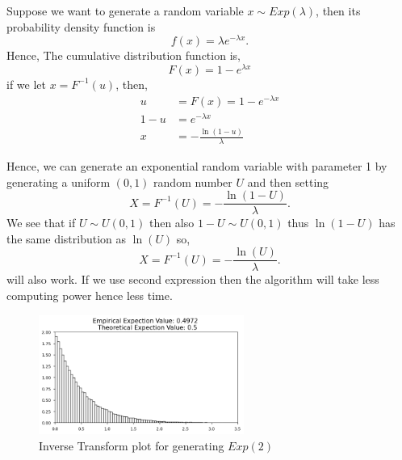\begin{example}
    \label{exponential distribution}
    Suppose we want to generate a random variable $x\sim Exp(\lambda)$, then its probability density function is 
    \[
    f(x) = \lambda e^{-\lambda x}.
    \] 
    Hence, The cumulative distribution function is,
    \[
    F(x) = 1-e^{\lambda x}
    \] 
    if we let $x=F^{-1}(u)$, then,
    \begin{align*}
        u&=F(x)=1-e^{-\lambda x} \\ 
         1-u &= e ^{-\lambda x}\\ 
         x &= - \frac{\ln(1-u)}{\lambda}
    \end{align*}
    
    Hence, we can generate an exponential random variable with parameter 1 by generating a uniform $(0,1)$ random number $U$ and then setting
    \[
    X = F^{-1}(U) = -\frac{\ln(1-U)}{\lambda}.
    \] 
    We see that if $U\sim U(0,1)$ then also $1-U\sim U(0,1)$ thus  $\ln(1-U)$ has the same distribution as  $\ln(U)$ so,
    \[
    X = F^{-1}(U) = -\frac{\ln(U)}{\lambda}.
    \] 
    will also work. If we use second expression then the algorithm will take less computing power hence less time.
    \begin{figure}[H]
        
        \centering
        \includegraphics[width=0.6\textwidth]{images/exp_ITA.png}
        \caption{Inverse Transform plot for generating $Exp(2)$}
    \end{figure}
\end{example}
